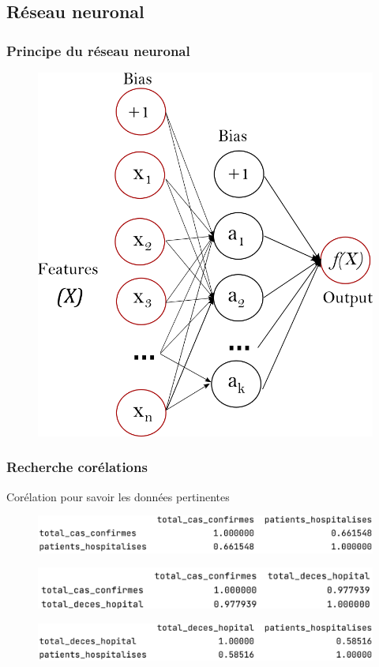 \documentclass{beamer}
\begin{document}
\subsection{Réseau neuronal}
\begin{frame}
	\frametitle{Principe du réseau neuronal}
	\begin{figure}[t]
		\centering
		\begin{minipage}{0.5\textwidth}
			\includegraphics[scale=0.2]{nn_sk}
		\end{minipage}
	\end{figure}
\end{frame}

\begin{frame}
	\frametitle{Recherche corélations}
	Corélation pour savoir les données pertinentes
	\begin{figure}
		\includegraphics[width=\textwidth]{cor2}
	\end{figure}
	\begin{figure}
		\includegraphics[width=\textwidth]{cor1}
	\end{figure}
	\begin{figure}
		\includegraphics[width=\textwidth]{cor4}
	\end{figure}
\end{frame}
\end{document}
